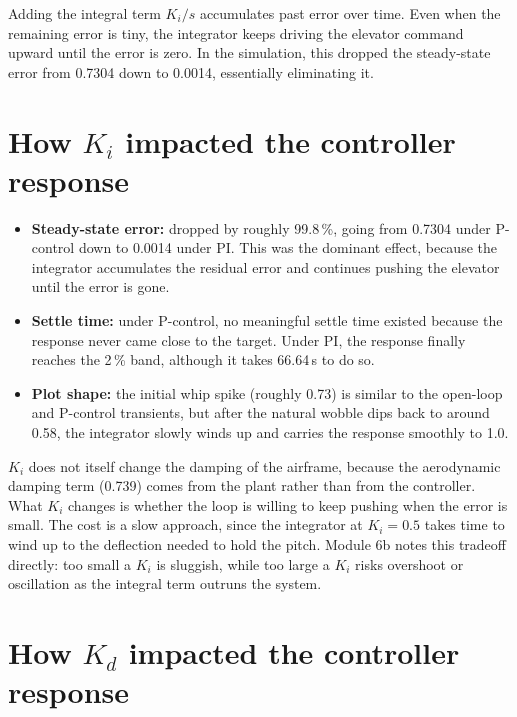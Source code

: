\documentclass[11pt,letterpaper]{article}
\begin{document}
Adding the integral term $K_{i}/s$ accumulates past error over time. Even
when the remaining error is tiny, the integrator keeps driving the elevator
command upward until the error is zero. In the simulation, this dropped the
steady-state error from 0.7304 down to 0.0014, essentially eliminating it.

\section{How $K_{i}$ impacted the controller response}

\begin{itemize}
  \item \textbf{Steady-state error:} dropped by roughly 99.8\,\%, going
  from 0.7304 under P-control down to 0.0014 under PI. This was the
  dominant effect, because the integrator accumulates the residual error
  and continues pushing the elevator until the error is gone.
  \item \textbf{Settle time:} under P-control, no meaningful settle time
  existed because the response never came close to the target. Under PI,
  the response finally reaches the 2\,\% band, although it takes 66.64\,s
  to do so.
  \item \textbf{Plot shape:} the initial whip spike (roughly 0.73) is
  similar to the open-loop and P-control transients, but after the natural
  wobble dips back to around 0.58, the integrator slowly winds up and
  carries the response smoothly to 1.0.
\end{itemize}

$K_{i}$ does not itself change the damping of the airframe, because the
aerodynamic damping term (0.739) comes from the plant rather than from the
controller. What $K_{i}$ changes is whether the loop is willing to keep
pushing when the error is small. The cost is a slow approach, since the
integrator at $K_{i}=0.5$ takes time to wind up to the deflection needed to
hold the pitch. Module 6b notes this tradeoff directly: too small a
$K_{i}$ is sluggish, while too large a $K_{i}$ risks overshoot or
oscillation as the integral term outruns the system.

\section{How $K_{d}$ impacted the controller response}
\end{document}
